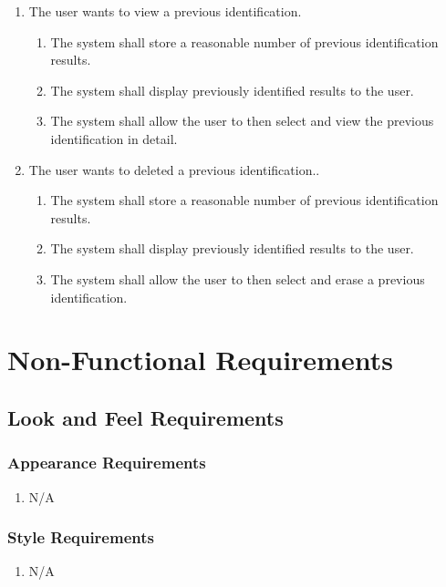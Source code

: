 \documentclass[]{article}
\begin{document}
\begin{enumerate}[{VP}1.]
\begin{enumerate}[{BE1}.1]
		\item The user wants to view a previous identification.
		\begin{enumerate}
			\item The system shall store a reasonable number of previous identification results.
			\item The system shall display previously identified results to the user.
			\item The system shall allow the user to then select and view the previous identification in detail.
		\end{enumerate}
		\item The user wants to deleted a previous identification..
		\begin{enumerate}
			\item The system shall store a reasonable number of previous identification results.
			\item The system shall display previously identified results to the user.
			\item The system shall allow the user to then select and erase a previous identification.

		\end{enumerate}
	\end{enumerate}
	
\end{enumerate}


\newpage
\section{Non-Functional Requirements}
\label{sec:non-functional_requirements}
\subsection{Look and Feel Requirements}
\label{sub:look_and_feel_requirements}

\subsubsection{Appearance Requirements}
\label{ssub:appearance_requirements}
\begin{enumerate}[{LF}1. ]
	\item N/A
\end{enumerate}

\subsubsection{Style Requirements}
\label{ssub:style_requirements}
\begin{enumerate}[{LF}1. ]
\item N/A
\end{enumerate}
\end{document}
